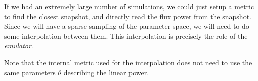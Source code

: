 If we had an extremely large number of simulations, we could just setup a
metric to find the closest snapshot, and directly read the flux power
from the snapshot.
Since we will have a sparse sampling of the parameter space, we will need
to do some interpolation between them. 
This interpolation is precisely the role of the \textit{emulator}.

Note that the internal metric used for the interpolation does not need to 
use the same parameters $\theta$ describing the linear power.

